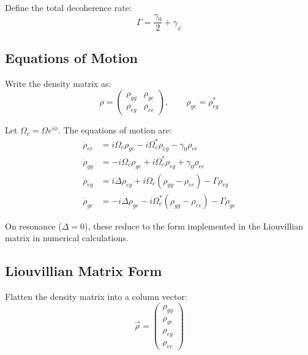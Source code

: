 Define the total decoherence rate:
\begin{equation}
	\Gamma = \frac{\gamma_0}{2} + \gamma_\varphi
	\label{eq:TotalDecoherenceRate}
\end{equation}

\subsection{Equations of Motion}

Write the density matrix as:
\begin{equation}
	\rho = \begin{pmatrix}
		\rho_{gg} & \rho_{ge} \\
		\rho_{eg} & \rho_{ee}
	\end{pmatrix}, \qquad \rho_{ge} = \rho_{eg}^*
	\label{eq:DensityMatrixElements}
\end{equation}

Let \(\Omega_c = \Omega e^{i\phi}\). The equations of motion are:
\begin{equation}
	\boxed{
		\begin{aligned}
			\dot{\rho}_{ee} & = i \Omega_c \rho_{ge} - i \Omega_c^* \rho_{eg} - \gamma_0 \rho_{ee}            \\[6pt]
			\dot{\rho}_{gg} & = -i \Omega_c \rho_{ge} + i \Omega_c^* \rho_{eg} + \gamma_0 \rho_{ee}           \\[6pt]
			\dot{\rho}_{eg} & = i \Delta \rho_{eg} + i \Omega_c (\rho_{gg} - \rho_{ee}) - \Gamma \rho_{eg}    \\[6pt]
			\dot{\rho}_{ge} & = -i \Delta \rho_{ge} - i \Omega_c^* (\rho_{gg} - \rho_{ee}) - \Gamma \rho_{ge}
		\end{aligned}
	}
	\label{eq:BlochEquations}
\end{equation}

On resonance (\(\Delta = 0\)), these reduce to the form implemented in the Liouvillian matrix in numerical calculations.

\subsection{Liouvillian Matrix Form}

Flatten the density matrix into a column vector:
\begin{equation}
	\vec{\rho} =
	\begin{pmatrix}
		\rho_{gg} \\
		\rho_{ge} \\
		\rho_{eg} \\
		\rho_{ee}
	\end{pmatrix}
	\label{eq:DensityMatrixVector}
\end{equation}

